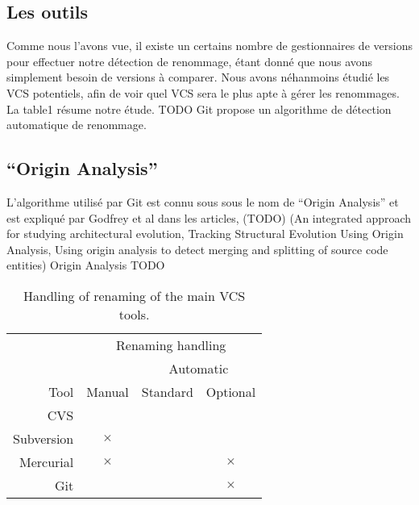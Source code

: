 \subsection{Les outils}
Comme nous l'avons vue, il existe un certains nombre de gestionnaires de versions pour effectuer notre détection de renommage, étant donné que nous avons simplement besoin de versions à comparer. Nous avons néhanmoins étudié les VCS potentiels, afin de voir quel VCS sera le plus apte à gérer les renommages. La table1 résume notre étude. TODO Git propose un algorithme de détection automatique de renommage.\\

\subsection{``Origin Analysis''}
L'algorithme utilisé par Git est connu sous sous le nom de ``Origin Analysis'' et est expliqué par Godfrey et al dans les articles, (TODO) (An integrated approach for studying architectural evolution, Tracking Structural Evolution Using Origin Analysis, Using origin analysis to detect merging and splitting of source code entities)
Origin Analysis TODO\\

\begin{table}
\centering
\begin{tabular}{rccc}
\toprule
 & \multicolumn{3}{c}{Renaming handling}\\
\cmidrule{2-4}
& & \multicolumn{2}{c}{Automatic}\\
\cmidrule{3-4}
Tool & Manual & Standard & Optional\\
\midrule
CVS & & &\\
Subversion & $\times$ & &\\
Mercurial & $\times$ & & $\times$\\
Git & & & $\times$\\
\bottomrule
\end{tabular}
\caption{Handling of renaming of the main VCS tools.}
\label{tab:vcs}
\end{table}
